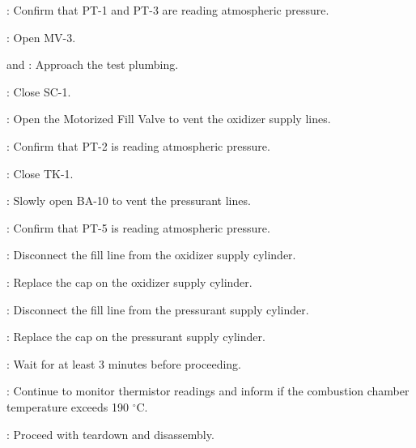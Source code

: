 \begin{checklist}
    \item \daq{}: Confirm that PT-1 and PT-3 are reading atmospheric pressure.
    \item \control{}: Open MV-3.
    \item \primary{} and \secondary{}: Approach the test plumbing.
    \item \primary{}: Close SC-1.
    \item \control{}: Open the Motorized Fill Valve to vent the oxidizer supply lines.
    \item \daq{}: Confirm that PT-2 is reading atmospheric pressure.
	\item \primary{}: Close TK-1.
	\item \primary{}: Slowly open BA-10 to vent the pressurant lines.
    \item \daq{}: Confirm that PT-5 is reading atmospheric pressure.
    \item \primary{}: Disconnect the fill line from the oxidizer supply cylinder.
    \item \primary{}: Replace the cap on the oxidizer supply cylinder.
    \item \primary{}: Disconnect the fill line from the pressurant supply cylinder.
    \item \primary{}: Replace the cap on the pressurant supply cylinder.
    \item \ops{}: Wait for at least 3 minutes before proceeding.
    \item \daq{}: Continue to monitor thermistor readings and inform \ops{} if the combustion chamber temperature exceeds 190 $^\circ$C.
    \item \ops{}: Proceed with teardown and disassembly.

\end{checklist}
\setcounter{checklistnum}{0}


